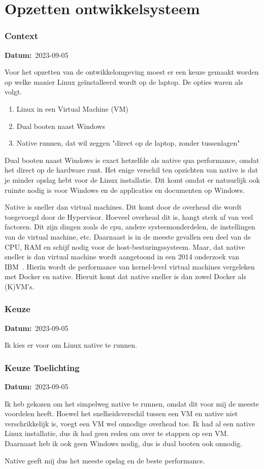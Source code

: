 \documentclass[a4paper]{report}
\newcommand{\personalbox}{
  \begin{tcolorbox}[hbox, colback=green!5!white,colframe=green!75!black,
    left=.1mm, right=.1mm, top=.1mm, bottom=.1mm, fontupper=\scriptsize\sffamily]
    Persoonlijke Keuze
  \end{tcolorbox}
}
\newcommand{\personalchoice}[1]{
  \section[ #1 ]{#1~\mbox{\raisebox{-2.5pt}{\personalbox}}}
}
\newcommand{\timestamp}[1]{
  \mbox{\scriptsize \textbf{Datum:} #1} \smallbreak
}
\begin{document}
\personalchoice{Opzetten ontwikkelsysteem}
\subsubsection{Context}
\timestamp{2023-09-05}
Voor het opzetten van de ontwikkelomgeving moest er een keuze gemaakt worden op welke manier Linux geïnstalleerd wordt op de laptop. 
De opties waren als volgt.
\begin{enumerate}
  \item Linux in een Virtual Machine (VM)
  \item Dual booten naast Windows
  \item Native runnen, dat wil zeggen "direct op de laptop, zonder tussenlagen"
\end{enumerate}

Dual booten naast Windows is exact hetzelfde als native qua performance, omdat het direct op de hardware runt. 
Het enige verschil ten opzichten van native is dat je minder opslag hebt voor de Linux installatie. Dit komt omdat er natuurlijk ook ruimte nodig is voor Windows en de applicaties en documenten op Windows. 
\par\smallskip
Native is sneller dan virtual machines. Dit komt door de overhead die wordt toegevoegd door de Hypervisor. 
Hoeveel overhead dit is, hangt sterk af van veel factoren. Dit zijn dingen zoals de cpu, andere systeemonderdelen, de instellingen van de virtual machine, etc. 
Daarnaast is in de meeste gevallen een deel van de CPU, RAM en schijf nodig voor de host-besturingssysteem.
Maar, dat native sneller is dan virtual machine wordt aangetoond in een 2014 onderzoek van IBM~\cite{felter2015updated}.
Hierin wordt de performance van kernel-level virtual machines vergeleken met Docker en native. 
Hieruit komt dat native sneller is dan zowel Docker als (K)VM's. 

\subsubsection{Keuze}
\timestamp{2023-09-05}
Ik kies er voor om Linux native te runnen.

\subsubsection{Keuze Toelichting}
\timestamp{2023-09-05}
Ik heb gekozen om het simpelweg native te runnen, omdat dit voor mij de meeste voordelen heeft.
Hoewel het snelheidsverschil tussen een VM en native niet verschrikkelijk is, voegt een VM wel onnodige overhead toe. 
Ik had al een native Linux installatie, dus ik had geen reden om over te stappen op een VM. 
Daarnaast heb ik ook geen Windows nodig, dus is dual booten ook onnodig. 
\par\smallskip
Native geeft mij dus het meeste opslag en de beste performance. 
\end{document}
